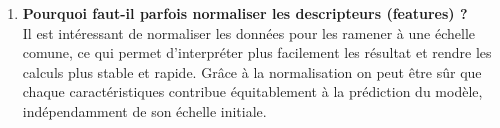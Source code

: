 \begin{enumerate}
    \item \textbf{Pourquoi faut-il parfois normaliser les descripteurs (features) ?} \\
    Il est intéressant de normaliser les données pour les ramener à une échelle comune, 
    ce qui permet d'interpréter plus facilement les résultat et rendre les calculs plus stable et rapide. Grâce à la normalisation on peut être sûr que chaque caractéristiques contribue équitablement à la prédiction du modèle, indépendamment de son échelle initiale. \\
    
\end{enumerate}